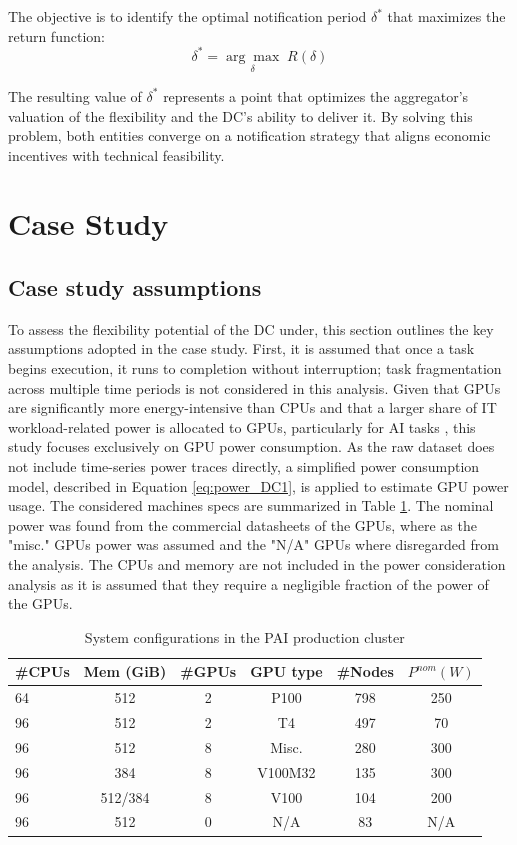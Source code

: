\documentclass[preprint,12pt]{elsarticle}
\begin{document}
The objective is to identify the optimal notification period \( \delta^* \) that maximizes the return function:
\begin{equation}
    \delta^* = \underset{\delta}{\arg\max} \; R(\delta)
\end{equation}

The resulting value of \( \delta^* \) represents a point that optimizes the aggregator’s valuation of the flexibility and the DC’s ability to deliver it. By solving this problem, both entities converge on a notification strategy that aligns economic incentives with technical feasibility.


\section{Case Study}\label{case study}
\subsection{Case study assumptions}
To assess the flexibility potential of the DC under, this section outlines the key assumptions adopted in the case study. First, it is assumed that once a task begins execution, it runs to completion without interruption; task fragmentation across multiple time periods is not considered in this analysis. Given that GPUs are significantly more energy-intensive than CPUs and that a larger share of IT workload-related power is allocated to GPUs, particularly for AI tasks \cite{LLM}, this study focuses exclusively on GPU power consumption. As the raw dataset does not include time-series power traces directly, a simplified power consumption model, described in Equation \ref{eq:power_DC1}, is applied to estimate GPU power usage.
The considered machines specs are summarized in Table \ref{tab:specs}. The nominal power was found from the commercial datasheets of the GPUs, where as the "misc." GPUs power was assumed and the "N/A" GPUs where disregarded from the analysis. The CPUs and memory are not included in the power consideration analysis as it is assumed that they require a negligible fraction of the power of the GPUs.

\begin{table}[h!]
\centering
\caption{System configurations in the PAI production cluster \cite{Weng2022}}
\label{tab:specs}
\begin{tabular}{lccccc}
\toprule
\textbf{\#CPUs} & \textbf{Mem (GiB)} & \textbf{\#GPUs} & \textbf{GPU type} & \textbf{\#Nodes} & \textbf{$P^{nom} (W)$} \\
\midrule
 64  & 512       & 2 & P100        & 798 &  250 \\
 96  & 512       & 2 & T4          & 497 & 70\\
 96  & 512       & 8 & Misc.       & 280 & 300\\
 96  & 384       & 8 & V100M32 & 135  & 300\\
 96  & 512/384   & 8 & V100    & 104 & 200\\
 96  & 512       & 0 & N/A         & 83 & N/A \\
\bottomrule
\end{tabular}
\end{table}
\end{document}
